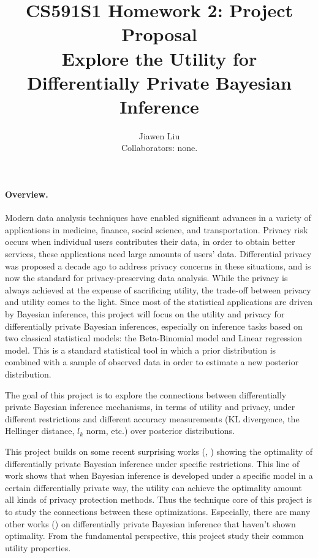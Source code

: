 \documentclass{article}
\begin{document}
\title{
{\textbf{CS591S1 Homework 2: Project Proposal}\\
\large{Explore the Utility for Differentially Private Bayesian Inference}}
}
\author{Jiawen Liu\\
Collaborators: none.}

\date{}
\maketitle

\paragraph{Overview.}
Modern data analysis techniques have enabled significant
advances in a variety of applications in medicine, finance,
social science, and transportation. Privacy risk occurs when individual users contributes their data, in order to obtain better
services, these applications need large amounts of users’ data. 
Differential privacy was proposed a decade ago to address privacy concerns in these situations, and is now the standard for privacy-preserving data analysis.
While the privacy is always achieved at the expense of sacrificing utility, the trade-off between privacy and utility comes to the light.
Since most of the statistical applications are driven by Bayesian inference, this project will focus on the utility and privacy for differentially private Bayesian inferences, especially on inference tasks based on two classical statistical models: the Beta-Binomial model and Linear regression model.
This is a standard statistical tool in which a prior distribution is combined
with a sample of observed data in order to estimate a new posterior distribution.

The goal of this project is to explore the connections between differentially private Bayesian
inference mechanisms, in terms of utility and privacy, under different restrictions and different accuracy measurements (KL divergence, the Hellinger
distance, $l_k$ norm, etc.) over posterior distributions.
%
%

This project builds on some recent surprising works (\cite{ghosh2012universally}, \cite{zhang2016differential}) showing the optimality of differentially private Bayesian inference under specific restrictions. This line of work shows that when Bayesian inference is developed under a specific model in a certain differentially private way, the utility can achieve the optimality amount all kinds of privacy protection methods.
Thus the technique core of this project is to study the connections between these optimizations. 
Especially, there are many other works (\cite{bernstein2019differentially}) on differentially private Bayesian inference that haven't shown optimality.   
From the fundamental perspective, this project study their common utility properties.
%
\end{document}

